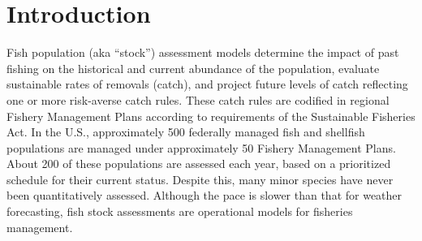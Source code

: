 \hypertarget{intro}{}
\section{Introduction}

Fish population (aka ``stock'') assessment models determine the impact of past fishing on the historical and current abundance of the population, evaluate sustainable rates of removals (catch), and project future levels of catch reflecting one or more risk-averse catch rules. These catch rules are codified in regional Fishery Management Plans according to requirements of the Sustainable Fisheries Act. In the U.S., approximately 500 federally managed fish and shellfish populations are managed under approximately 50 Fishery Management Plans. About 200 of these populations are assessed each year, based on a prioritized schedule for their current status. Despite this, many minor species have never been quantitatively assessed. Although the pace is slower than that for weather forecasting, fish stock assessments are operational models for fisheries management.



